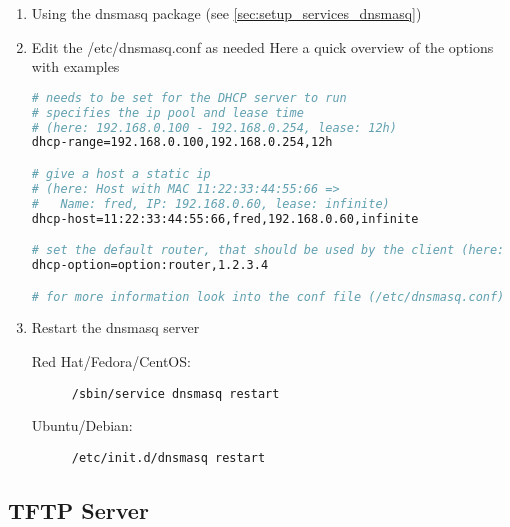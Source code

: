 \begin{enumerate}
\item Using the dnsmasq package (see \autoref{sec:setup_services_dnsmasq})
\item Edit the /etc/dnsmasq.conf as needed
Here a quick overview of the options with examples
\begin{lstlisting}[language=sh]
# needs to be set for the DHCP server to run
# specifies the ip pool and lease time
# (here: 192.168.0.100 - 192.168.0.254, lease: 12h)
dhcp-range=192.168.0.100,192.168.0.254,12h

# give a host a static ip
# (here: Host with MAC 11:22:33:44:55:66 => 
#   Name: fred, IP: 192.168.0.60, lease: infinite)
dhcp-host=11:22:33:44:55:66,fred,192.168.0.60,infinite

# set the default router, that should be used by the client (here: 1.2.3.4)
dhcp-option=option:router,1.2.3.4

# for more information look into the conf file (/etc/dnsmasq.conf)
\end{lstlisting}
\item Restart the dnsmasq server
  \begin{description}
  \item[Red Hat/Fedora/CentOS:] \lstinline[language=sh]{/sbin/service dnsmasq restart}
  \item[Ubuntu/Debian:] \lstinline[language=sh]{/etc/init.d/dnsmasq restart}
  \end{description}
\end{enumerate}

\subsection{TFTP Server}
\label{sec:setup_services_tftp-server}


